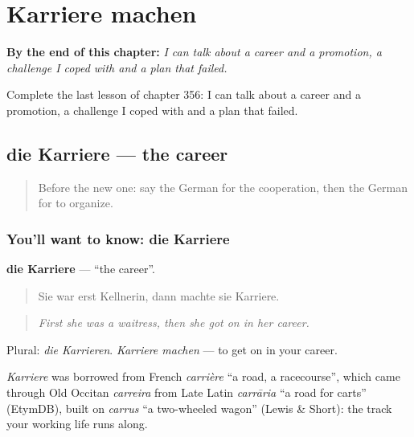 
\chapter{Karriere machen}
\label{ch:ge-karriere-machen}

\begin{chapteropening}
\textbf{By the end of this chapter:} \emph{I can talk about a career and a promotion, a challenge I coped with and a plan that failed.}

Complete the last lesson of chapter 356: I can talk about a career and a promotion, a challenge I coped with and a plan that failed.
\end{chapteropening}

\section[die Karriere]{die Karriere — the career}

\label{lesson:GE-C356-karriere}



\begin{quote}
Before the new one: say the German for the cooperation, then the German for to organize.
\end{quote}

\subsection*{You'll want to know: die Karriere}
\textbf{die Karriere} — \textquotedblleft{}the career\textquotedblright{}.

\begin{quote}
Sie war erst Kellnerin, dann machte sie Karriere.
\end{quote}

\begin{quote}
\emph{First she was a waitress, then she got on in her career.}
\end{quote}

Plural: \emph{die Karrieren}. \emph{Karriere machen} — to get on in your career.

\begin{cousinweb}
\emph{Karriere} was borrowed from French \emph{carrière} \textquotedblleft{}a road, a racecourse\textquotedblright{}, which came through Old Occitan \emph{carreira} from Late Latin \emph{carrāria} \textquotedblleft{}a road for carts\textquotedblright{} (EtymDB), built on \emph{carrus} \textquotedblleft{}a two-wheeled wagon\textquotedblright{} (Lewis \& Short): the track your working life runs along.
\end{cousinweb}

